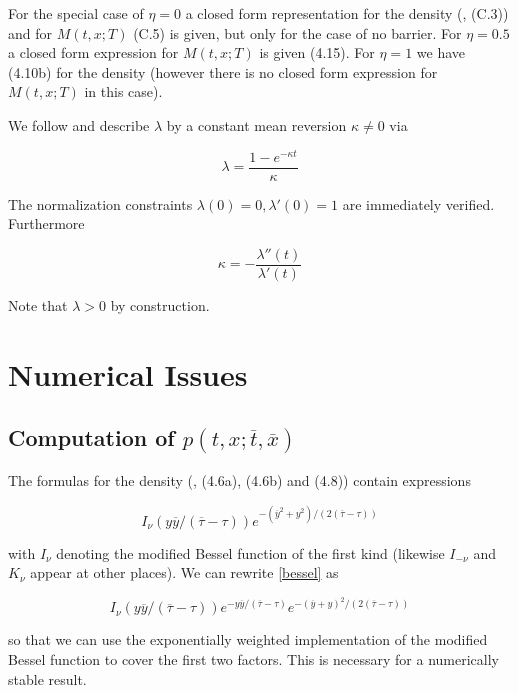 \documentclass{amsart}
\theoremstyle{plain}
\numberwithin{equation}{section}
\begin{document}
For the special case of $\eta=0$ a closed form representation for the density (\cite{betaeta}, (C.3)) and for $M(t,x;T)$ (C.5) is given, but only for the case of no barrier. For $\eta=0.5$ a closed form expression for $M(t,x;T)$ is given (4.15). For $\eta=1$ we have (4.10b) for the density (however there is no closed form expression for $M(t,x;T)$ in this case).

We follow \cite{piterbarg} and describe $\lambda$ by a constant mean reversion $\kappa \neq 0$ via

\begin{equation}
\lambda = \frac{1 - e^{-\kappa t}}{\kappa}
\end{equation}

The normalization constraints $\lambda(0)=0, \lambda'(0)=1$ are immediately verified. Furthermore

\begin{equation}
\kappa = -\frac{\lambda''(t)}{\lambda'(t)}
\end{equation}

Note that $\lambda > 0$ by construction.

\section{Numerical Issues}

\subsection{Computation of $p(t,x;\overline{t},\overline{x})$}

The formulas for the density (\cite{betaeta}, (4.6a), (4.6b) and (4.8)) contain expressions

\begin{equation}\label{bessel}
I_\nu(y\overline{y}/(\overline{\tau}-\tau)) e^{-(\overline{y}^2+y^2)/(2(\overline{\tau}-\tau))}
\end{equation}

with $I_\nu$ denoting the modified Bessel function of the first kind (likewise $I_{-\nu}$ and $K_\nu$ appear at other places). We can rewrite \ref{bessel} as

\begin{equation}
I_\nu(y\overline{y}/(\overline{\tau}-\tau))e^{-y\overline{y}/(\overline{\tau}-\tau)} e^{-(\overline{y}+y)^2/(2(\overline{\tau}-\tau))}
\end{equation}

so that we can use the exponentially weighted implementation of the modified Bessel function to cover the first two factors. This is necessary for a numerically stable result.
\end{document}
